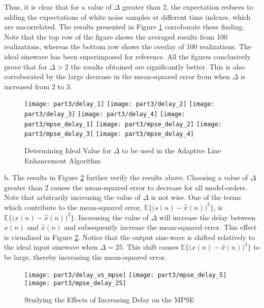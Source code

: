 \noindent{}Thus, it is clear that for a value of $\Delta$ greater than 2, the expectation reduces to adding the expectations of white noise samples at different time indexes, which are uncorrelated. The results presented in Figure \ref{fig:ale} corroborate these finding. Note that the top row of the figure shows the averaged results from 100 realizations, whereas the bottom row shows the overlay of 100 realizations. The ideal sinewave has been superimposed for reference. All the figures conclusively prove that for $\Delta>2$ the results obtained are significantly better. This is also corroborated by the large decrease in the mean-squared error from when $\Delta$ is increased from $2$ to $3$.

\begin{figure}[H]
\centering{}
\texttt{[image: part3/delay\_1]}
\texttt{[image: part3/delay\_2]}
\texttt{[image: part3/delay\_3]}
\texttt{[image: part3/delay\_4]}
\texttt{[image: part3/mpse\_delay\_1]}
\texttt{[image: part3/mpse\_delay\_2]}
\texttt{[image: part3/mpse\_delay\_3]}
\texttt{[image: part3/mpse\_delay\_4]}
\caption{Determining Ideal Value for $\Delta$ to be used in the Adaptive Line Enhancement Algorithm}
\label{fig:ale}
\end{figure}


\noindent{}b. The results in Figure \ref{fig:ale_delay} further verify the results above. Choosing a value of $\Delta$ greater than $2$ causes the mean-squared error to decrease for all model-orders. Note that arbitrarily increasing the value of $\Delta$ is not wise. One of the terms which contribute to the mean-squared error, $\mathbb{E}\bigg\{\bigg(s(n)-\hat{x}(n)\bigg)^2\bigg\}$, is $\mathbb{E}\bigg\{\bigg(x(n)-\hat{x}(n)\bigg)^2\bigg\}$. Increasing the value of $\Delta$ will increase the delay between $x(n)$ and $\hat{x}(n)$ and subsequently increase the mean-squared error. This effect is visualized in Figure \ref{fig:ale_delay}. Notice that the output sine-wave is shifted relatively to the ideal input sinewave when $\Delta=25$. This shift causes $\mathbb{E}\bigg\{\bigg(x(n)-\hat{x}(n)\bigg)^2\bigg\}$ to be large, thereby increasing the mean-squared error.

\begin{figure}[H]
\centering{}
\texttt{[image: part3/delay\_vs\_mpse]}
\texttt{[image: part3/mpse\_delay\_5]}
\texttt{[image: part3/mpse\_delay\_25]}
\caption{Studying the Effects of Increasing Delay on the MPSE}
\label{fig:ale_delay}
\end{figure}


